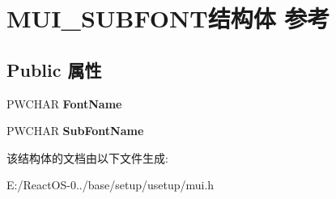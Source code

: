 \hypertarget{struct_m_u_i___s_u_b_f_o_n_t}{}\section{M\+U\+I\+\_\+\+S\+U\+B\+F\+O\+N\+T结构体 参考}
\label{struct_m_u_i___s_u_b_f_o_n_t}
\subsection*{Public 属性}
\begin{DoxyCompactItemize}
\item 
\mbox{\label{struct_m_u_i___s_u_b_f_o_n_t_a7cbcd2a87b11d6b484de2088f1739160}} 
P\+W\+C\+H\+AR {\bfseries Font\+Name}
\item 
\mbox{\label{struct_m_u_i___s_u_b_f_o_n_t_ab7555f18c8ca1ab8eebb777c69f57f68}} 
P\+W\+C\+H\+AR {\bfseries Sub\+Font\+Name}
\end{DoxyCompactItemize}


该结构体的文档由以下文件生成\+:\begin{DoxyCompactItemize}
\item 
E\+:/\+React\+O\+S-\/0../base/setup/usetup/mui.\+h\end{DoxyCompactItemize}

